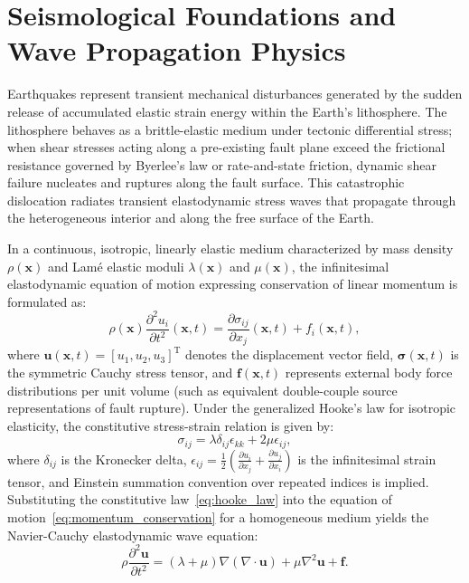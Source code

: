 
\label{chap:Introduction}

\section{Seismological Foundations and Wave Propagation Physics}
\label{sec:wave_physics}

Earthquakes represent transient mechanical disturbances generated by the sudden release of accumulated elastic strain energy within the Earth's lithosphere. The lithosphere behaves as a brittle-elastic medium under tectonic differential stress; when shear stresses acting along a pre-existing fault plane exceed the frictional resistance governed by Byerlee's law or rate-and-state friction, dynamic shear failure nucleates and ruptures along the fault surface. This catastrophic dislocation radiates transient elastodynamic stress waves that propagate through the heterogeneous interior and along the free surface of the Earth.

In a continuous, isotropic, linearly elastic medium characterized by mass density $\rho(\mathbf{x})$ and Lamé elastic moduli $\lambda(\mathbf{x})$ and $\mu(\mathbf{x})$, the infinitesimal elastodynamic equation of motion expressing conservation of linear momentum is formulated as:
\begin{equation}
  \rho(\mathbf{x}) \frac{\partial^2 u_i}{\partial t^2}(\mathbf{x}, t) = \frac{\partial \sigma_{ij}}{\partial x_j}(\mathbf{x}, t) + f_i(\mathbf{x}, t),
  \label{eq:momentum_conservation}
\end{equation}
where $\mathbf{u}(\mathbf{x}, t) = [u_1, u_2, u_3]^{\mathrm{T}}$ denotes the displacement vector field, $\boldsymbol{\sigma}(\mathbf{x}, t)$ is the symmetric Cauchy stress tensor, and $\mathbf{f}(\mathbf{x}, t)$ represents external body force distributions per unit volume (such as equivalent double-couple source representations of fault rupture). Under the generalized Hooke's law for isotropic elasticity, the constitutive stress-strain relation is given by:
\begin{equation}
  \sigma_{ij} = \lambda \delta_{ij} \epsilon_{kk} + 2\mu \epsilon_{ij},
  \label{eq:hooke_law}
\end{equation}
where $\delta_{ij}$ is the Kronecker delta, $\epsilon_{ij} = \frac{1}{2}\left(\frac{\partial u_i}{\partial x_j} + \frac{\partial u_j}{\partial x_i}\right)$ is the infinitesimal strain tensor, and Einstein summation convention over repeated indices is implied. Substituting the constitutive law~\eqref{eq:hooke_law} into the equation of motion~\eqref{eq:momentum_conservation} for a homogeneous medium yields the Navier-Cauchy elastodynamic wave equation:
\begin{equation}
  \rho \frac{\partial^2 \mathbf{u}}{\partial t^2} = (\lambda + \mu)\nabla(\nabla \cdot \mathbf{u}) + \mu \nabla^2 \mathbf{u} + \mathbf{f}.
  \label{eq:navier_cauchy}
\end{equation}

